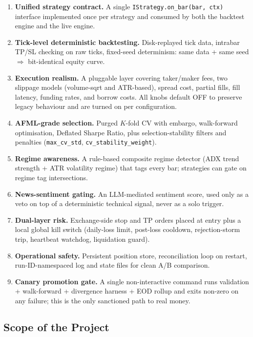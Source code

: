 \documentclass[a4paper, 12pt, titlepage]{article}
\begin{document}
\begin{enumerate}[label=O\arabic*.,leftmargin=2em]
    \item \textbf{Unified strategy contract.} A single
    \texttt{IStrategy.on\_bar(bar, ctx)} interface implemented once
    per strategy and consumed by both the backtest engine and the
    live engine.
    \item \textbf{Tick-level deterministic backtesting.} Disk-replayed
    tick data, intrabar TP/SL checking on raw ticks, fixed-seed
    determinism: same data + same seed $\Rightarrow$ bit-identical
    equity curve.
    \item \textbf{Execution realism.} A pluggable layer covering
    taker/maker fees, two slippage models (volume-sqrt and ATR-based),
    spread cost, partial fills, fill latency, funding rates, and
    borrow costs. All knobs default OFF to preserve legacy behaviour
    and are turned on per configuration.
    \item \textbf{AFML-grade selection.} Purged $K$-fold CV with
    embargo, walk-forward optimisation, Deflated Sharpe Ratio, plus
    selection-stability filters and penalties (\texttt{max\_cv\_std},
    \texttt{cv\_stability\_weight}).
    \item \textbf{Regime awareness.} A rule-based composite regime
    detector (ADX trend strength + ATR volatility regime) that tags
    every bar; strategies can gate on regime tag intersections.
    \item \textbf{News-sentiment gating.} An LLM-mediated sentiment
    score, used only as a veto on top of a deterministic technical
    signal, never as a solo trigger.
    \item \textbf{Dual-layer risk.} Exchange-side stop and TP orders
    placed at entry plus a local global kill switch (daily-loss
    limit, post-loss cooldown, rejection-storm trip, heartbeat
    watchdog, liquidation guard).
    \item \textbf{Operational safety.} Persistent position store,
    reconciliation loop on restart, run-ID-namespaced log and state
    files for clean A/B comparison.
    \item \textbf{Canary promotion gate.} A single non-interactive
    command runs validation + walk-forward + divergence harness +
    EOD rollup and exits non-zero on any failure; this is the only
    sanctioned path to real money.
\end{enumerate}

\subsection{Scope of the Project}
\end{document}
